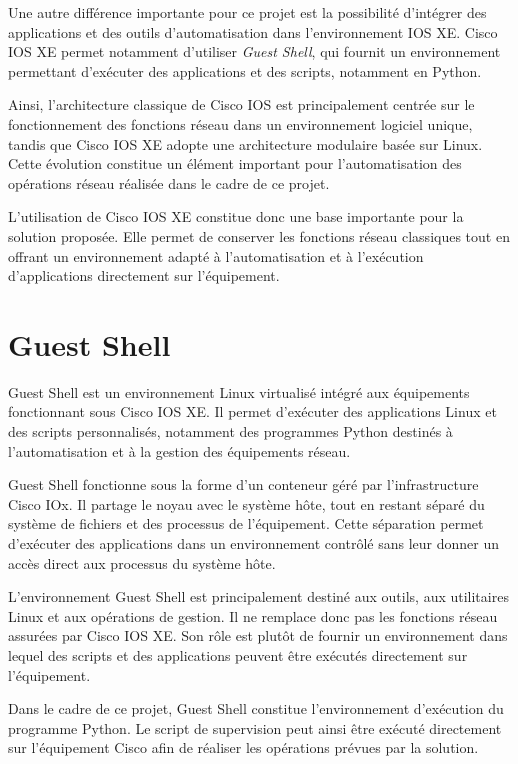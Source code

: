 \documentclass[12pt, a4paper, oneside]{report}
\begin{document}
Une autre différence importante pour ce projet est la possibilité d'intégrer des applications 
et des outils d'automatisation dans l'environnement IOS XE. Cisco IOS XE permet notamment d'utiliser 
\textit{Guest Shell}, qui fournit un environnement permettant d'exécuter des applications et des scripts, 
notamment en Python.

Ainsi, l'architecture classique de Cisco IOS est principalement centrée sur le fonctionnement 
des fonctions réseau dans un environnement logiciel unique, tandis que Cisco IOS XE adopte une 
architecture modulaire basée sur Linux. Cette évolution constitue un élément important pour 
l'automatisation des opérations réseau réalisée dans le cadre de ce projet.

L'utilisation de Cisco IOS XE constitue donc une base importante pour la solution proposée. 
Elle permet de conserver les fonctions réseau classiques tout en offrant un environnement 
adapté à l'automatisation et à l'exécution d'applications directement sur l'équipement.

\section{Guest Shell}

Guest Shell est un environnement Linux virtualisé intégré aux équipements fonctionnant 
sous Cisco IOS XE. Il permet d'exécuter des applications Linux et des scripts personnalisés, 
notamment des programmes Python destinés à l'automatisation et à la gestion des équipements 
réseau.

Guest Shell fonctionne sous la forme d'un conteneur géré par l'infrastructure Cisco IOx. 
Il partage le noyau avec le système hôte, tout en restant séparé du système de fichiers 
et des processus de l'équipement. Cette séparation permet d'exécuter des applications 
dans un environnement contrôlé sans leur donner un accès direct aux processus du système 
hôte.

L'environnement Guest Shell est principalement destiné aux outils, aux utilitaires Linux 
et aux opérations de gestion. Il ne remplace donc pas les fonctions réseau assurées par 
Cisco IOS XE. Son rôle est plutôt de fournir un environnement dans lequel des scripts et 
des applications peuvent être exécutés directement sur l'équipement.

Dans le cadre de ce projet, Guest Shell constitue l'environnement d'exécution du programme Python. 
Le script de supervision peut ainsi être exécuté directement sur l'équipement Cisco afin de 
réaliser les opérations prévues par la solution.
\end{document}
